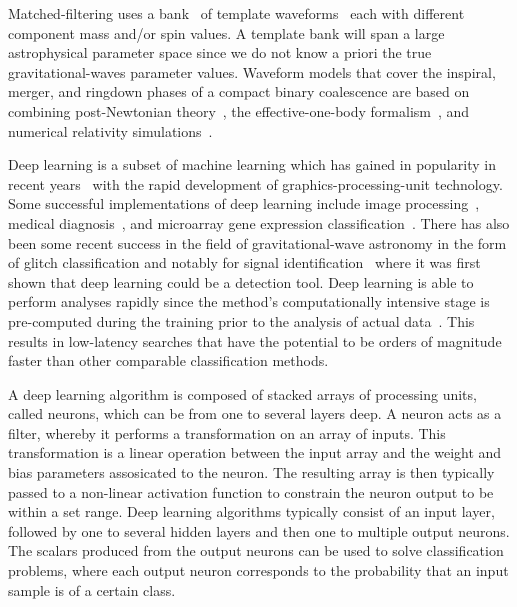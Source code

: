 \documentclass[%
showpacs,
 amsmath,amssymb,
 aps,
 twocolumn,
 prl,
 reprint,
floatfix,
]{revtex4-1}
\begin{document}
%
%
Matched-filtering uses a bank~\cite{PhysRevD.86.084017,
1705.01845,PhysRevD.80.104014, PhysRevD.90.082004, PhysRevD.89.084041} of
template waveforms~\cite{PhysRevD.44.3819, PhysRevD.89.061502,
PhysRevD.89.024003, Blanchet2014} each with different component mass
and/or spin values. A template bank will span a large astrophysical parameter
space since we do not know a priori the true gravitational-waves parameter
values. Waveform models that cover the inspiral, merger, and ringdown phases of
a compact binary coalescence are based on combining post-Newtonian
theory~\cite{PhysRevD.84.049901,PhysRevD.80.084043,Blanchet2014,PhysRevD.93.084054},
the effective-one-body formalism~\cite{PhysRevD.59.084006}, and numerical
relativity simulations~\cite{PhysRevLett.95.121101}.

%
%
Deep learning is a subset of machine learning which has gained in popularity in
recent years~\cite{NIPS2012_4824, 1406.2661, 1409.1556, 1412.7062, 1311.2901,
1409.4842} with the rapid development of graphics-processing-unit technology.
Some successful implementations of deep learning include image processing~\cite{1603.08511,1412.2306,NIPS2012_4824}, medical
diagnosis~\cite{KONONENKO200189}, and microarray gene expression
classification~\cite{Pirooznia2008}. There has also been
some recent success in the field of gravitational-wave astronomy in the form of
glitch classification \cite{PhysRevD.95.104059,
0264-9381-34-6-064003,1706.07446} and notably for signal
identification~\cite{1701.00008} where it was first shown that deep learning
could be a detection tool. Deep learning is able to %
perform analyses rapidly since the method's computationally intensive
stage is pre-computed during the training prior to the analysis of actual 
data~\cite{Goodfellow-et-al-2016}.
This results in low-latency searches that have the potential to be orders of magnitude
faster than other comparable classification methods. 

%
%
A deep learning algorithm is composed of stacked arrays of processing units,
called neurons, which can be from one to several layers deep. A neuron
acts as a filter, whereby it performs a transformation on an array of inputs.
This transformation is a linear operation between the input array and the
weight and bias parameters assosicated to the neuron. The resulting array is
then typically passed to a non-linear activation function to constrain the
neuron output to be within a set range. Deep learning algorithms typically
consist of an input layer, followed by one to several hidden layers and then
one to multiple output neurons. The scalars produced from the output neurons
can be used to solve classification problems, where each output neuron
corresponds to the probability that an input sample is of a certain
class.
\end{document}
